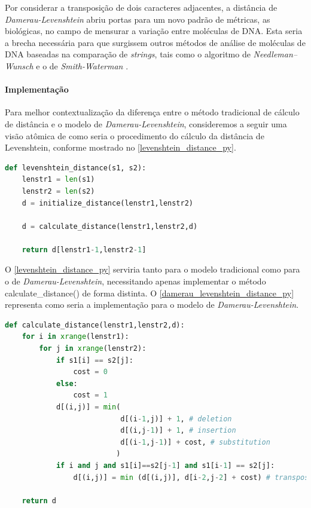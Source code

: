 Por  considerar  a transposição de dois caracteres adjacentes, a distância de \textit{Damerau-Levenshtein} abriu portas para um novo padrão de métricas, as biológicas, no campo de mensurar a variação entre moléculas de DNA. Esta seria a brecha necessária para que surgissem outros métodos de análise de moléculas de DNA baseadas na comparação de \textit{strings}, tais como o algoritmo de \textit{Needleman–Wunsch} \cite{needleman1970general} e  o de \textit{Smith-Waterman} \cite{smith1981identification}.

\paragraph*{Implementação} %
\label{sub:implementa_damerau_levenshtein}

Para melhor contextualização da diferença entre o método tradicional de cálculo de distância e o modelo de \textit{Damerau-Levenshtein}, consideremos a seguir uma visão atômica de como seria o procedimento do cálculo da distância de Levenshtein, conforme mostrado no \autoref{levenshtein_distance_py}.

\begin{lstlisting}[language=Python,label=levenshtein_distance_py,caption={Visão atômica do cálculo da distância de Levenshtein}]
def levenshtein_distance(s1, s2):
    lenstr1 = len(s1)
    lenstr2 = len(s2)
    d = initialize_distance(lenstr1,lenstr2)

	d = calculate_distance(lenstr1,lenstr2,d) 

    return d[lenstr1-1,lenstr2-1]
\end{lstlisting}

O \autoref{levenshtein_distance_py} serviria tanto para o modelo tradicional como para o de \textit{Damerau-Levenshtein}, necessitando apenas implementar o método {\code calculate\_distance()} de forma distinta. O \autoref{damerau_levenshtein_distance_py} representa como seria a implementação para o modelo de \textit{Damerau-Levenshtein}.

\begin{lstlisting}[language=Python,label=damerau_levenshtein_distance_py,caption={Implementação da distância de Damerau-Levenshtein}]
def calculate_distance(lenstr1,lenstr2,d):
    for i in xrange(lenstr1):
        for j in xrange(lenstr2):
            if s1[i] == s2[j]:
                cost = 0
            else:
                cost = 1
            d[(i,j)] = min(
                           d[(i-1,j)] + 1, # deletion
                           d[(i,j-1)] + 1, # insertion
                           d[(i-1,j-1)] + cost, # substitution
                          )
            if i and j and s1[i]==s2[j-1] and s1[i-1] == s2[j]:
                d[(i,j)] = min (d[(i,j)], d[i-2,j-2] + cost) # transposition
 
    return d
\end{lstlisting}

